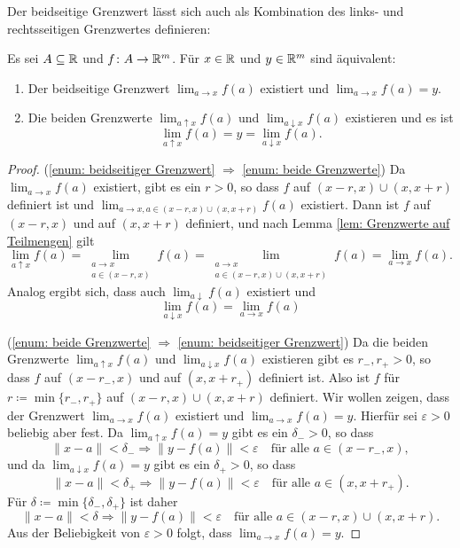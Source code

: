\documentclass[a4paper,10pt]{article}
\begin{document}
Der beidseitige Grenzwert lässt sich auch als Kombination des links- und rechtsseitigen Grenzwertes definieren:


\begin{lem}
 Es sei $A \subseteq \mathbb{R}$ und $f \colon A \to \mathbb{R}^m$. Für $x \in \mathbb{R}$ und $y \in \mathbb{R}^m$ sind äquivalent:
 \begin{enumerate}
  \item\label{enum: beidseitiger Grenzwert}
   Der beidseitige Grenzwert $\lim_{a \to x} f(a)$ existiert und $\lim_{a \to x} f(a) = y$.
  \item\label{enum: beide Grenzwerte}
   Die beiden Grenzwerte $\lim_{a \uparrow x} f(a)$ und $\lim_{a \downarrow x} f(a)$ existieren und es ist
   \[
    \lim_{a \uparrow x} f(a) = y = \lim_{a \downarrow x} f(a).
   \]
 \end{enumerate}
\end{lem}
\begin{proof}
 (\ref{enum: beidseitiger Grenzwert} $\Rightarrow$ \ref{enum: beide Grenzwerte}) Da $\lim_{a \to x} f(a)$ existiert, gibt es ein $r > 0$, so dass $f$ auf $(x-r,x) \cup (x,x+r)$ definiert ist und $\lim_{a \to x, a \in (x-r,x) \cup (x,x+r)} f(a)$ existiert. Dann ist $f$ auf $(x-r,x)$ und auf $(x,x+r)$ definiert, und nach Lemma \ref{lem: Grenzwerte auf Teilmengen} gilt
 \[
  \lim_{a \uparrow x} f(a)
  = \lim_{\substack{a \to x \\ a \in (x-r,x)}} f(a)
  = \lim_{\substack{a \to x \\ a \in (x-r,x) \cup (x,x+r)}} f(a)
  = \lim_{a \to x} f(a).
 \]
 Analog ergibt sich, dass auch $\lim_{a \downarrow} f(a)$ existiert und
 \[
  \lim_{a \downarrow x} f(a) = \lim_{a \to x} f(a)
 \]
 
 (\ref{enum: beide Grenzwerte} $\Rightarrow$ \ref{enum: beidseitiger Grenzwert}) Da die beiden Grenzwerte $\lim_{a \uparrow x} f(a)$ und $\lim_{a \downarrow x} f(a)$ existieren gibt es $r_-, r_+ > 0$, so dass $f$ auf $(x-r_-,x)$ und auf $(x,x+r_+)$ definiert ist. Also ist $f$ für \mbox{$r \coloneqq \min\{r_-, r_+\}$} auf $(x-r,x) \cup (x,x+r)$ definiert. Wir wollen zeigen, dass der Grenzwert $\lim_{a \to x} f(a)$ existiert und $\lim_{a \to x} f(a) = y$. Hierfür sei $\varepsilon > 0$ beliebig aber fest. Da $\lim_{a \uparrow x} f(a) = y$ gibt es ein $\delta_- > 0$, so dass
 \[
  \|x-a\| < \delta_- \Rightarrow \|y-f(a)\| < \varepsilon
  \quad \text{für alle $a \in (x-r_-,x)$},
 \]
 und da $\lim_{a \downarrow x} f(a) = y$ gibt es ein $\delta_+ > 0$, so dass
 \[
  \|x-a\| < \delta_+ \Rightarrow \|y-f(a)\| < \varepsilon
  \quad \text{für alle $a \in (x,x+r_+)$}.
 \]
 Für $\delta \coloneqq \min\{\delta_-, \delta_+\}$ ist daher
 \[
  \|x-a\| < \delta \Rightarrow \|y-f(a)\| < \varepsilon
  \quad \text{für alle $a \in (x-r,x) \cup (x,x+r)$}.
 \]
 Aus der Beliebigkeit von $\varepsilon > 0$ folgt, dass $\lim_{a \to x} f(a) = y$.
\end{proof}
\end{document}

